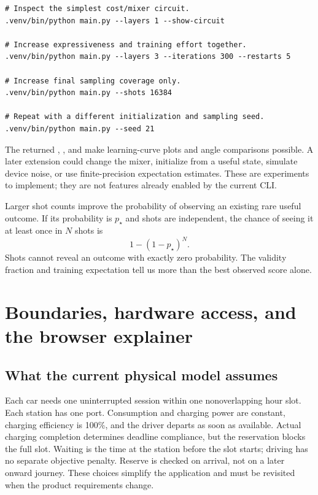 \begin{lstlisting}
# Inspect the simplest cost/mixer circuit.
.venv/bin/python main.py --layers 1 --show-circuit

# Increase expressiveness and training effort together.
.venv/bin/python main.py --layers 3 --iterations 300 --restarts 5

# Increase final sampling coverage only.
.venv/bin/python main.py --shots 16384

# Repeat with a different initialization and sampling seed.
.venv/bin/python main.py --seed 21
\end{lstlisting}

The returned , , and  make
learning-curve plots and angle comparisons possible. A later extension could
change the mixer, initialize from a useful state, simulate device noise, or use
finite-precision expectation estimates. These are experiments to implement;
they are not features already enabled by the current CLI.

Larger shot counts improve the probability of observing an existing rare useful
outcome. If its probability is $p_\star$ and shots are independent, the chance
of seeing it at least once in $N$ shots is
\begin{equation}
1-(1-p_\star)^N.
\end{equation}
Shots cannot reveal an outcome with exactly zero probability. The validity
fraction and training expectation tell us more than the best observed score alone.

\section{Boundaries, hardware access, and the browser explainer}
\subsection{What the current physical model assumes}
Each car needs one uninterrupted session within one nonoverlapping hour slot.
Each station has one port. Consumption and charging power are constant, charging
efficiency is 100\%, and the driver departs as soon as available. Actual charging
completion determines deadline compliance, but the reservation blocks the full
slot. Waiting is the time at the station before the slot starts; driving has no
separate objective penalty. Reserve is checked on arrival, not on a later onward
journey. These choices simplify the application and must be revisited when the
product requirements change.

